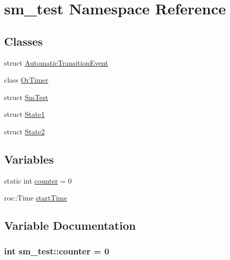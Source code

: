 \hypertarget{namespacesm__test}{}\section{sm\+\_\+test Namespace Reference}
\label{namespacesm__test}
\subsection*{Classes}
\begin{DoxyCompactItemize}
\item 
struct \hyperlink{structsm__test_1_1AutomaticTransitionEvent}{Automatic\+Transition\+Event}
\item 
class \hyperlink{classsm__test_1_1OrTimer}{Or\+Timer}
\item 
struct \hyperlink{structsm__test_1_1SmTest}{Sm\+Test}
\item 
struct \hyperlink{structsm__test_1_1State1}{State1}
\item 
struct \hyperlink{structsm__test_1_1State2}{State2}
\end{DoxyCompactItemize}
\subsection*{Variables}
\begin{DoxyCompactItemize}
\item 
static int \hyperlink{namespacesm__test_a1cae0029e5a72ff5017da7e71b3e4a00}{counter} = 0
\item 
ros\+::\+Time \hyperlink{namespacesm__test_aa99c742599f6e6c98f883ce4c03f743b}{start\+Time}
\end{DoxyCompactItemize}


\subsection{Variable Documentation}
\subsubsection[{\texorpdfstring{counter}{counter}}]{\setlength{\rightskip}{0pt plus 5cm}int sm\+\_\+test\+::counter = 0\hspace{0.3cm}{\ttfamily [static]}}\hypertarget{namespacesm__test_a1cae0029e5a72ff5017da7e71b3e4a00}{}\label{namespacesm__test_a1cae0029e5a72ff5017da7e71b3e4a00}


